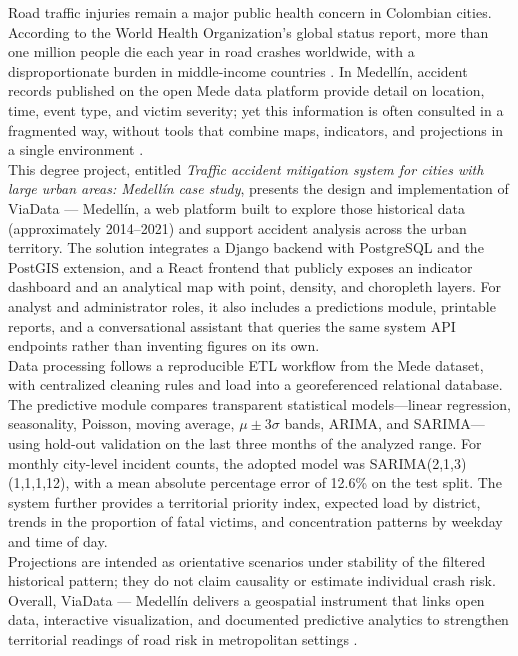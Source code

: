 Road traffic injuries remain a major public health concern in Colombian cities. According to the World Health Organization's global status report, more than one million people die each year in road crashes worldwide, with a disproportionate burden in middle-income countries \cite{oms2024}. In Medellín, accident records published on the open Mede data platform provide detail on location, time, event type, and victim severity; yet this information is often consulted in a fragmented way, without tools that combine maps, indicators, and projections in a single environment \cite{mina2024,parraga2024}.\\
This degree project, entitled \textit{Traffic accident mitigation system for cities with large urban areas: Medellín case study}, presents the design and implementation of ViaData — Medellín, a web platform built to explore those historical data (approximately 2014--2021) and support accident analysis across the urban territory. The solution integrates a Django backend with PostgreSQL and the PostGIS extension, and a React frontend that publicly exposes an indicator dashboard and an analytical map with point, density, and choropleth layers. For analyst and administrator roles, it also includes a predictions module, printable reports, and a conversational assistant that queries the same system API endpoints rather than inventing figures on its own.\\
Data processing follows a reproducible ETL workflow from the Mede dataset, with centralized cleaning rules and load into a georeferenced relational database. The predictive module compares transparent statistical models---linear regression, seasonality, Poisson, moving average, $\mu \pm 3\sigma$ bands, ARIMA, and SARIMA---using hold-out validation on the last three months of the analyzed range. For monthly city-level incident counts, the adopted model was SARIMA(2,1,3)(1,1,1,12), with a mean absolute percentage error of 12.6\% on the test split. The system further provides a territorial priority index, expected load by district, trends in the proportion of fatal victims, and concentration patterns by weekday and time of day.\\
Projections are intended as orientative scenarios under stability of the filtered historical pattern; they do not claim causality or estimate individual crash risk. Overall, ViaData — Medellín delivers a geospatial instrument that links open data, interactive visualization, and documented predictive analytics to strengthen territorial readings of road risk in metropolitan settings \cite{monar2025}.

